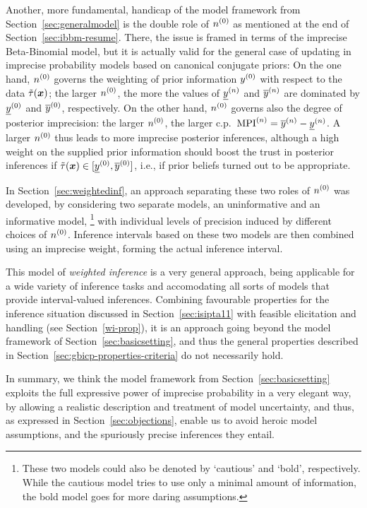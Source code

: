 Another, more fundamental, handicap of the model framework from Section~\ref{sec:generalmodel}
is the double role of $n^{(0)}$ as mentioned at the end of Section~\ref{sec:ibbm-resume}.
There, the issue is framed in terms of the imprecise Beta-Binomial model,
but it is actually valid for the general case of updating
in imprecise probability models based on canonical conjugate priors:
On the one hand, $n^{(0)}$ governs the weighting of prior information $y^{(0)}$ with
respect to the data $\tilde{\tau}({\bm x})$;
the larger $n^{(0)}$, the more the values of $\underline{y}^{(n)}$ and $\overline{y}^{(n)}$ are dominated by $\underline{y}^{(0)}$ and $\overline{y}^{(0)}$, respectively.
On the other hand, $n^{(0)}$ governs also the degree of posterior imprecision:
the larger $n^{(0)}$, the larger c.p.\ ${\rm MPI}^{(n)} = \overline{y}^{(n)} - \underline{y}^{(n)}$.
A larger $n^{(0)}$ thus leads to more imprecise posterior inferences,
although a high weight on the supplied prior information
should boost the trust in posterior inferences if $\tilde{\tau}({\bm x}) \in [\underline{y}^{(0)}, \overline{y}^{(0)}]$,
i.e., if prior beliefs turned out to be appropriate.

In Section~\ref{sec:weightedinf},
an approach separating these two roles of $n^{(0)}$ was developed,
by considering two separate models,
an uninformative and an informative model,%
\footnote{These two models could also be denoted by `cautious' and `bold', respectively.
While the cautious model tries to use only a minimal amount of information, %
the bold model goes for more daring assumptions.}
with individual levels of precision induced by different choices of $n^{(0)}$. 
Inference intervals based on these two models are then combined %
using an imprecise weight, forming the actual inference interval.

This model of \emph{weighted inference} is a very general approach,
being applicable for a wide variety of inference tasks and accomodating all sorts of models that provide interval-valued inferences.
Combining favourable properties 
for the inference situation discussed in Section~\ref{sec:isipta11}
with feasible elicitation and handling (see Section~\ref{wi-prop}),
it is an approach going beyond the model framework of Section~\ref{sec:basicsetting},
and thus the general properties described in Section~\ref{sec:gbicp-properties-criteria}
do not necessarily hold.

\medskip

In summary, we think the model framework from Section~\ref{sec:basicsetting}
exploits the full expressive power of imprecise probability %
in a very elegant way, by allowing a realistic description and treatment
of model uncertainty, and thus, as expressed in Section~\ref{sec:objections},
enable us to avoid heroic model assumptions, and the spuriously precise inferences they entail. 

